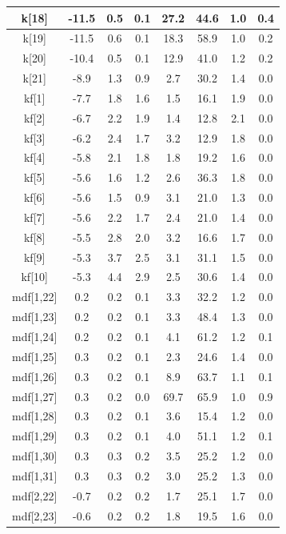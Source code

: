 \begin{longtable}{|c|c|c|c|c|c|c|c|}
\hline
k[18] & -11.5 & 0.5 & 0.1 & 27.2 & 44.6 & 1.0 & 0.4 \\
\hline
k[19] & -11.5 & 0.6 & 0.1 & 18.3 & 58.9 & 1.0 & 0.2 \\
\hline
k[20] & -10.4 & 0.5 & 0.1 & 12.9 & 41.0 & 1.2 & 0.2 \\
\hline
k[21] & -8.9 & 1.3 & 0.9 & 2.7 & 30.2 & 1.4 & 0.0 \\
\hline
kf[1] & -7.7 & 1.8 & 1.6 & 1.5 & 16.1 & 1.9 & 0.0 \\
\hline
kf[2] & -6.7 & 2.2 & 1.9 & 1.4 & 12.8 & 2.1 & 0.0 \\
\hline
kf[3] & -6.2 & 2.4 & 1.7 & 3.2 & 12.9 & 1.8 & 0.0 \\
\hline
kf[4] & -5.8 & 2.1 & 1.8 & 1.8 & 19.2 & 1.6 & 0.0 \\
\hline
kf[5] & -5.6 & 1.6 & 1.2 & 2.6 & 36.3 & 1.8 & 0.0 \\
\hline
kf[6] & -5.6 & 1.5 & 0.9 & 3.1 & 21.0 & 1.3 & 0.0 \\
\hline
kf[7] & -5.6 & 2.2 & 1.7 & 2.4 & 21.0 & 1.4 & 0.0 \\
\hline
kf[8] & -5.5 & 2.8 & 2.0 & 3.2 & 16.6 & 1.7 & 0.0 \\
\hline
kf[9] & -5.3 & 3.7 & 2.5 & 3.1 & 31.1 & 1.5 & 0.0 \\
\hline
kf[10] & -5.3 & 4.4 & 2.9 & 2.5 & 30.6 & 1.4 & 0.0 \\
\hline
mdf[1,22] & 0.2 & 0.2 & 0.1 & 3.3 & 32.2 & 1.2 & 0.0 \\
\hline
mdf[1,23] & 0.2 & 0.2 & 0.1 & 3.3 & 48.4 & 1.3 & 0.0 \\
\hline
mdf[1,24] & 0.2 & 0.2 & 0.1 & 4.1 & 61.2 & 1.2 & 0.1 \\
\hline
mdf[1,25] & 0.3 & 0.2 & 0.1 & 2.3 & 24.6 & 1.4 & 0.0 \\
\hline
mdf[1,26] & 0.3 & 0.2 & 0.1 & 8.9 & 63.7 & 1.1 & 0.1 \\
\hline
mdf[1,27] & 0.3 & 0.2 & 0.0 & 69.7 & 65.9 & 1.0 & 0.9 \\
\hline
mdf[1,28] & 0.3 & 0.2 & 0.1 & 3.6 & 15.4 & 1.2 & 0.0 \\
\hline
mdf[1,29] & 0.3 & 0.2 & 0.1 & 4.0 & 51.1 & 1.2 & 0.1 \\
\hline
mdf[1,30] & 0.3 & 0.3 & 0.2 & 3.5 & 25.2 & 1.2 & 0.0 \\
\hline
mdf[1,31] & 0.3 & 0.3 & 0.2 & 3.0 & 25.2 & 1.3 & 0.0 \\
\hline
mdf[2,22] & -0.7 & 0.2 & 0.2 & 1.7 & 25.1 & 1.7 & 0.0 \\
\hline
mdf[2,23] & -0.6 & 0.2 & 0.2 & 1.8 & 19.5 & 1.6 & 0.0 \\

\end{longtable}
